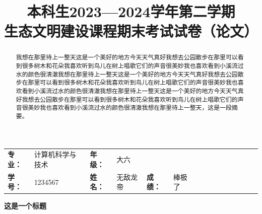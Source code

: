 \documentclass[withoutpreface,bwprint]{cumcmthesis}
\title{\zihao{4}本科生2023—2024学年第二学期\\生态文明建设课程期末考试试卷（论文）}
\begin{document}
\maketitle


\begin{center}
    {
    \begin{tabular}{lp{3.5cm}lp{3.5cm}lp{3.5cm}lp{3cm}lp{2cm}lp{3.5cm}lp{2cm}l}
        \textbf{专业：} & 计算机科学与技术  & \textbf{年级：}   & 大六           &      &  \\
        \textbf{学号：} & 1234567 & \textbf{姓名：} & 无敌龙帝  & \textbf{成绩：} & 棒极了 \\
    \end{tabular}
    }
    \vspace{0.8cm}
\end{center}

\newpage

\begin{center}
    \begin{spacing}{1.5} %
        {\hei {}\textbf{这是一个标题}}
    \end{spacing}
\end{center}



\begin{abstract}
        我想在那里待上一整天这是一个美好的地方今天天气真好我想去公园散步在那里可以看到很多树木和花朵我喜欢听到鸟儿在树上唱歌它们的声音很美妙我也喜欢看到小溪流过水的颜色很清澈我想在那里待上一整天这是一个美好的地方今天天气真好我想去公园散步在那里可以看到很多树木和花朵我喜欢听到鸟儿在树上唱歌它们的声音很美妙我也喜欢看到小溪流过水的颜色很清澈我想在那里待上一整天这是一个美好的地方今天天气真好我想去公园散步在那里可以看到很多树木和花朵我喜欢听到鸟儿在树上唱歌它们的声音很美妙我也喜欢看到小溪流过水的颜色很清澈我想在那里待上一整天，这是一段摘要。
\end{abstract}



\end{document}
